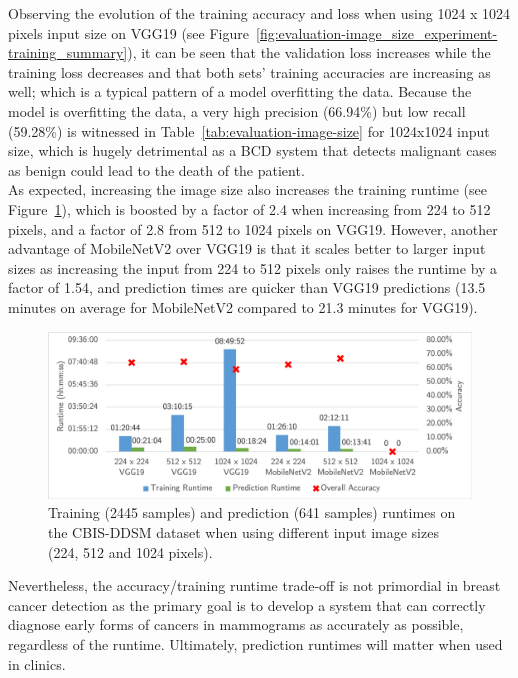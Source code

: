 Observing the evolution of the training accuracy and loss when using 1024 x 1024 pixels input size on VGG19 (see Figure~\ref{fig:evaluation-image_size_experiment-training_summary}), it can be seen that the validation loss increases while the training loss decreases and that both sets' training accuracies are increasing as well; which is a typical pattern of a model overfitting the data. Because the model is overfitting the data, a very high precision (66.94\%) but low recall (59.28\%) is witnessed in Table~\ref{tab:evaluation-image-size} for 1024x1024 input size, which is hugely detrimental as a BCD system that detects malignant cases as benign could lead to the death of the patient.\\

As expected, increasing the image size also increases the training runtime (see Figure~\ref{fig:evaluation-image_size_experiment-runtimes}), which is boosted by a factor of 2.4 when increasing from 224 to 512 pixels, and a factor of 2.8 from 512 to 1024 pixels on VGG19. However, another advantage of MobileNetV2 over VGG19 is that it scales better to larger input sizes as increasing the input from 224 to 512 pixels only raises the runtime by a factor of 1.54, and prediction times are quicker than VGG19 predictions (13.5 minutes on average for MobileNetV2 compared to 21.3 minutes for VGG19).

\begin{figure}[h]
\centerline{\includegraphics[width=\textwidth]{figures/evaluation/image_size_experiment/runtimes.png}}
\caption{\label{fig:evaluation-image_size_experiment-runtimes}Training (2445 samples) and prediction (641 samples) runtimes on the CBIS-DDSM dataset when using different input image sizes (224, 512 and 1024 pixels).}
\end{figure}

Nevertheless, the accuracy/training runtime trade-off is not primordial in breast cancer detection as the primary goal is to develop a system that can correctly diagnose early forms of cancers in mammograms as accurately as possible, regardless of the runtime. Ultimately, prediction runtimes will matter when used in clinics.

